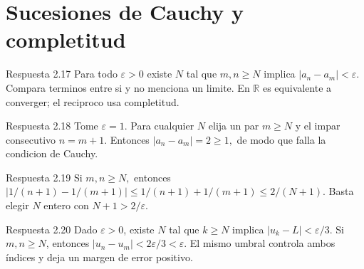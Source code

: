 \documentclass[10pt,a4paper,oneside,openany]{book}
\begin{document}
\section{Sucesiones de Cauchy y completitud}
\begin{PSevenAnswerFixed}{Respuesta 2.17}
Para todo \(\varepsilon >0\) existe \(N\) tal que \(m,n\ge N\) implica \(|a_n-a_m|<\varepsilon \). Compara terminos entre si y no menciona un limite. En \(\mathbb{R}\) es equivalente a converger; el reciproco usa completitud.
\end{PSevenAnswerFixed}
\begin{PSevenAnswerFixed}{Respuesta 2.18}
Tome \(\varepsilon =1\). Para cualquier \(N\) elija un par \(m\ge N\) y el impar consecutivo \(n=m+1\). Entonces \(|a_n-a_m|=2\ge 1,\) de modo que falla la condicion de Cauchy.
\end{PSevenAnswerFixed}
\begin{PSevenAnswerFixed}{Respuesta 2.19}
Si \(m,n\ge N,\) entonces \(|1/(n+1)-1/(m+1)|\le 1/(n+1)+1/(m+1)\le 2/(N+1)\). Basta elegir \(N\) entero con \(N+1>2/\varepsilon \).
\end{PSevenAnswerFixed}
\begin{PSevenAnswerFixed}{Respuesta 2.20}
Dado \(\varepsilon>0\), existe \(N\) tal que \(k\ge N\) implica \(|u_k-L|<\varepsilon/3\). Si \(m,n\ge N\), entonces \(|u_n-u_m|<2\varepsilon/3<\varepsilon\). El mismo umbral controla ambos índices y deja un margen de error positivo.
\end{PSevenAnswerFixed}
\end{document}
